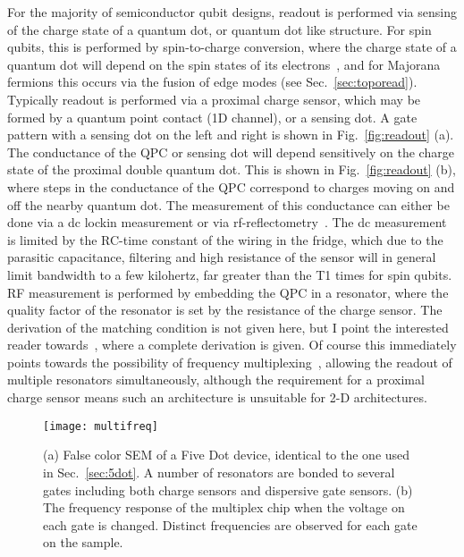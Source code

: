 For the majority of semiconductor qubit designs, readout is performed via sensing of the charge state of a quantum dot, or quantum dot like
structure. For spin qubits, this is performed by spin-to-charge conversion, where the charge state of a quantum dot will depend on the spin states
of its electrons~\cite{nature02693,PhysRevB.98.125404}, and for Majorana fermions this occurs via the fusion of edge modes (see Sec.~\ref{sec:toporead}).
Typically readout is performed via a proximal charge sensor, which may be formed by a quantum point contact (1D channel), or a sensing dot. A gate pattern
with a sensing dot on the left and right is shown in Fig.~\ref{fig:readout} (a). The conductance of the QPC or sensing dot will depend sensitively
on the charge state of the proximal double quantum dot. This is shown in Fig.~\ref{fig:readout} (b), where steps in the conductance of the QPC correspond to
charges moving on and off the nearby quantum dot. The measurement of this conductance can either be done via a dc lockin measurement or via
rf-reflectometry~\cite{Reilly:2007ig}. The dc measurement is limited by the RC-time constant of the wiring in the fridge, which due to the parasitic
capacitance, filtering and high resistance of the sensor will in general limit bandwidth to a few kilohertz, far greater than the T1 times for spin qubits.
RF measurement is performed by embedding the QPC in a resonator, where the quality factor of the resonator is set by the resistance of the charge sensor.
The derivation of the matching condition is not given here, but I point the interested reader towards~\cite{crootthesis}, where a complete derivation is given.
Of course this immediately points towards the possibility of frequency multiplexing~\cite{doi:10.1063/1.4868107}, allowing the readout of multiple
resonators simultaneously, although the requirement for a proximal charge sensor means such an architecture is unsuitable for 2-D architectures.

\begin{figure}
  \texttt{[image: multifreq]}
  \caption[Frequency multiplexed readout of a five-dot device]
  {\label{fig:multifreq}(a) False color SEM of a Five Dot device, identical to the one used in Sec.~\ref{sec:5dot}. A number of resonators are bonded to several gates
  including both charge sensors and dispersive gate sensors. (b) The frequency response of the multiplex chip when the voltage on each gate is changed. Distinct frequencies
  are observed for each gate on the sample.}
\end{figure}

